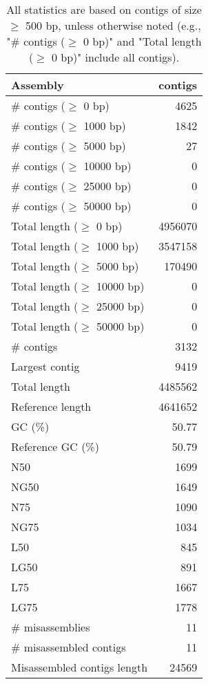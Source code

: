 \documentclass[12pt,a4paper]{article}
\begin{document}
\begin{table}[ht]
\begin{center}
\caption{All statistics are based on contigs of size $\geq$ 500 bp, unless otherwise noted (e.g., "\# contigs ($\geq$ 0 bp)" and "Total length ($\geq$ 0 bp)" include all contigs).}
\begin{tabular}{|l*{1}{|r}|}
\hline
Assembly & contigs \\ \hline
\# contigs ($\geq$ 0 bp) & 4625 \\ \hline
\# contigs ($\geq$ 1000 bp) & 1842 \\ \hline
\# contigs ($\geq$ 5000 bp) & 27 \\ \hline
\# contigs ($\geq$ 10000 bp) & 0 \\ \hline
\# contigs ($\geq$ 25000 bp) & 0 \\ \hline
\# contigs ($\geq$ 50000 bp) & 0 \\ \hline
Total length ($\geq$ 0 bp) & 4956070 \\ \hline
Total length ($\geq$ 1000 bp) & 3547158 \\ \hline
Total length ($\geq$ 5000 bp) & 170490 \\ \hline
Total length ($\geq$ 10000 bp) & 0 \\ \hline
Total length ($\geq$ 25000 bp) & 0 \\ \hline
Total length ($\geq$ 50000 bp) & 0 \\ \hline
\# contigs & 3132 \\ \hline
Largest contig & 9419 \\ \hline
Total length & 4485562 \\ \hline
Reference length & 4641652 \\ \hline
GC (\%) & 50.77 \\ \hline
Reference GC (\%) & 50.79 \\ \hline
N50 & 1699 \\ \hline
NG50 & 1649 \\ \hline
N75 & 1090 \\ \hline
NG75 & 1034 \\ \hline
L50 & 845 \\ \hline
LG50 & 891 \\ \hline
L75 & 1667 \\ \hline
LG75 & 1778 \\ \hline
\# misassemblies & 11 \\ \hline
\# misassembled contigs & 11 \\ \hline
Misassembled contigs length & 24569 \\ \hline

\end{tabular}
\end{center}
\end{table}
\end{document}
